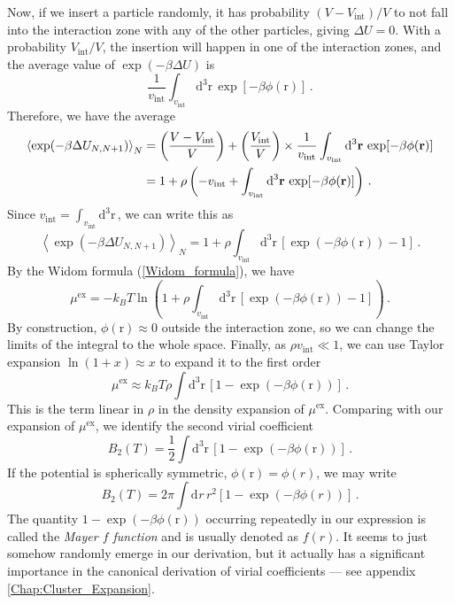 \documentclass{article}
\theoremstyle{plain}\theoremheaderfont{\normalfont\bfseries}\theorembodyfont{\rmfamily}\theoremseparator{.}\newtheorem*{thm}{Theorem}\newtheorem*{law}{Law}\newtheorem*{pos}{Postulate}
\numberwithin{equation}{section}
\newcommand{\dd}[2][]{\mathrm{d}^{#1} #2\,}
\newcommand{\eval}[1]{\left\langle #1 \right\rangle}
\newcommand{\vb}[1]{\bm{\mathrm{#1}}}
\begin{document}
    Now, if we insert a particle randomly, it has probability \((V-V_{\text{int}})/V\) to not fall into the interaction zone with any of the other particles, giving \(\Delta U=0\). With a probability \(V_{\text{int}}/V\), the insertion will happen in one of the interaction zones, and the average value of \(\exp(-\beta \Delta U)\) is
    \begin{equation}
        \frac{1}{v_{\text{int}}}\int_{v_{\text{int}}}\dd[3]{\vb{r}}\exp[-\beta\phi(\vb{r})]\,.
    \end{equation}
    Therefore, we have the average
    \begin{align}
        \eval{\exp(-\beta\Delta U_{N,N+1})}_N&=\left(\frac{V-V_{\text{int}}}{V}\right)+\left(\frac{V_{\text{int}}}{V}\right)\times\frac{1}{v_{\text{int}}}\int_{v_{\text{int}}}\dd[3]{\vb{r}}\exp[-\beta\phi(\vb{r})]\notag\\
        &=1+\rho\left(-v_{\text{int}}+\int_{v_{\text{int}}}\dd[3]{\vb{r}}\exp[-\beta\phi(\vb{r})]\right)\,.
    \end{align}
    Since \(v_{\text{int}}=\int_{v_{\text{int}}}\dd[3]{\vb{r}}\), we can write this as
    \begin{equation}
        \eval{\exp(-\beta\Delta U_{N,N+1})}_N=1+\rho\int_{v_{\text{int}}}\dd[3]{\vb{r}}[\exp(-\beta\phi(\vb{r}))-1]\,.
    \end{equation}
    By the Widom formula (\ref{Widom_formula}), we have
    \begin{equation}
        \mu^{\text{ex}}=-k_B T\ln\left(1+\rho\int_{v_{\text{int}}}\dd[3]{\vb{r}}[\exp(-\beta\phi(\vb{r}))-1]\right)\,.
    \end{equation}
    By construction, \(\phi(\vb{r})\approx 0\) outside the interaction zone, so we can change the limits of the integral to the whole space. Finally, as \(\rho v_{\text{int}}\ll 1\), we can use Taylor expansion \(\ln(1+x)\approx x\) to expand it to the first order
    \begin{equation}
        \mu^{\text{ex}}\approx k_B T\rho\int\dd[3]{\vb{r}}[1-\exp(-\beta\phi(\vb{r}))]\,.
    \end{equation}
    This is the term linear in \(\rho\) in the density expansion of \(\mu^{\text{ex}}\). Comparing with our expansion of \(\mu^{\text{ex}}\), we identify the second virial coefficient
    \begin{equation}
        B_2(T)=\frac{1}{2}\int\dd[3]{\vb{r}}[1-\exp(-\beta\phi(\vb{r}))]\,.
    \end{equation}
    If the potential is spherically symmetric, \(\phi(\vb{r})=\phi(r)\), we may write
    \begin{equation}
        B_2(T)=2\pi\int\dd{r}r^2[1-\exp(-\beta\phi(r))]\,.
    \end{equation}
    The quantity \(1-\exp(-\beta\phi(\vb{r}))\) occurring repeatedly in our expression is called the \textit{Mayer \(f\) function} and is usually denoted as \(f(r)\). It seems to just somehow randomly emerge in our derivation, but it actually has a significant importance in the canonical derivation of virial coefficients --- see appendix \cref{Chap:Cluster_Expansion}.
\end{document}
